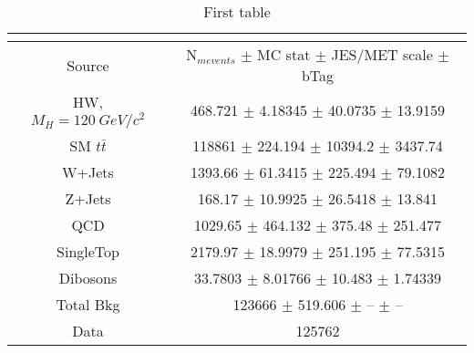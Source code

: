 \documentclass[landscape]{article}
\begin{document}
\begin{table}
\begin{center}
\begin{tabular}{ | c| c| }
\multicolumn{2}{c}{ } \\
\hline 
\multicolumn{1}{|c|}{Source} & \multicolumn{1}{|c|}{N$_{
m events}$ $\pm$ MC stat $\pm$ JES/MET scale $\pm$ bTag } \\
\hline 
\hline 
HW, $M_{H}=120~GeV/c^{2}$ & 468.721 $\pm$ 4.18345 $\pm$ 40.0735 $\pm$ 13.9159 \\ 
\hline 
SM $t\bar{t}$ & 118861 $\pm$ 224.194 $\pm$ 10394.2 $\pm$ 3437.74 \\ 
\hline 
W+Jets & 1393.66 $\pm$ 61.3415 $\pm$ 225.494 $\pm$ 79.1082 \\ 
\hline 
Z+Jets & 168.17 $\pm$ 10.9925 $\pm$ 26.5418 $\pm$ 13.841 \\ 
\hline 
QCD & 1029.65 $\pm$ 464.132 $\pm$ 375.48 $\pm$ 251.477 \\ 
\hline 
SingleTop & 2179.97 $\pm$ 18.9979 $\pm$ 251.195 $\pm$ 77.5315 \\ 
\hline 
Dibosons & 33.7803 $\pm$ 8.01766 $\pm$ 10.483 $\pm$ 1.74339 \\ 
\hline 
\hline 
Total Bkg & 123666 $\pm$ 519.606 $\pm$  --  $\pm$  --  \\ 
\hline 
\hline 
 Data  & 125762 \\ 
\hline 
\hline 
\end{tabular}
\end{center}
\caption{First table}
\end{table}
\end{document}
